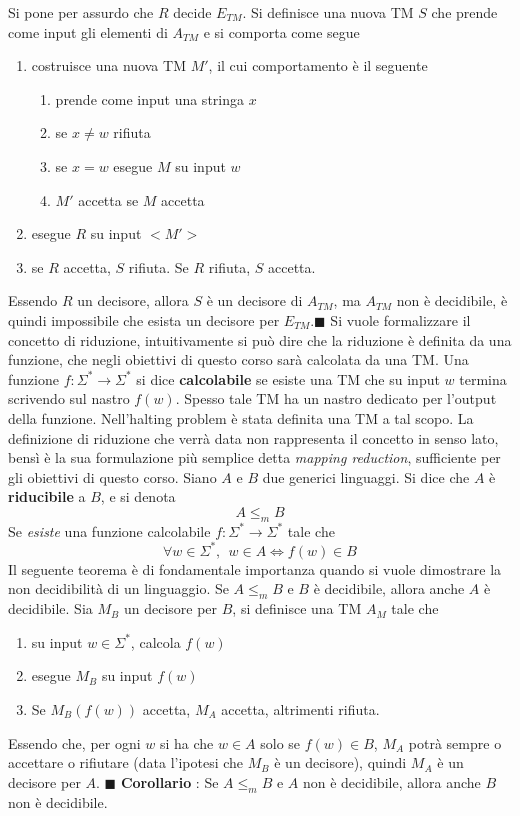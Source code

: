 \documentclass[10pt, letterpaper]{report}
\begin{document}
\dimo{} Si pone per assurdo che $R$ decide $E_{TM}$. Si definisce una nuova TM $S$ che prende come input gli elementi di $A_{TM}$ e si comporta come segue \begin{enumerate}
    \item costruisce una nuova TM $M'$, il cui comportamento è il seguente\begin{enumerate}
        \item prende come input una stringa $x$
        \item se $x\ne w$ rifiuta 
        \item se $x=w$ esegue $M$ su input $w$
        \item $M'$ accetta se $M$ accetta
    \end{enumerate}
    \item esegue $R$ su input $<M'>$
    \item se $R$ accetta, $S$ rifiuta. Se $R$ rifiuta, $S$ accetta.
\end{enumerate}
Essendo $R$ un decisore, allora $S$ è un decisore di $A_{TM}$, ma $A_{TM}$ non è decidibile, è quindi impossibile che esista un decisore per $E_{TM}$.\hfill$\blacksquare$\acc 
Si vuole formalizzare il concetto di riduzione, intuitivamente si può dire che la riduzione è definita da una funzione, che negli obiettivi di questo corso sarà calcolata da una TM.\acc 
{} Una funzione $f:\Sigma^*\rightarrow \Sigma^*$ si dice \textbf{calcolabile} se esiste una TM che su input $w$ termina scrivendo sul nastro $f(w)$. Spesso tale TM ha un nastro dedicato per l'output della funzione.\acc 
Nell'halting problem è stata definita una TM a tal scopo. La definizione di riduzione che verrà data non rappresenta il concetto in senso lato, bensì è la sua formulazione più semplice detta \textit{mapping reduction}, sufficiente per gli obiettivi di questo corso.\acc 
{} Siano $A$ e $B$ due generici linguaggi. Si dice che $A$ è \textbf{riducibile} a $B$, e si denota 
$$ A\le_m B$$
Se \textit{esiste} una funzione calcolabile $f:\Sigma^*\rightarrow \Sigma^*$ tale che 
$$ \forall w\in\Sigma^*, \ \ w\in A \iff f(w)\in B$$
Il seguente teorema è di fondamentale importanza quando si vuole dimostrare la non decidibilità di un linguaggio.\acc 
\teo{} Se $A\le_m B$ e $B$ è decidibile, allora  anche $A$ è decidibile.\acc 
\dimo{} Sia $M_B$ un decisore per $B$, si definisce una TM $A_M$ tale che \begin{enumerate}
    \item su input $w\in\Sigma^*$, calcola $f(w)$
    \item esegue $M_B$ su input $f(w)$ 
    \item Se $M_B(f(w))$ accetta, $M_A$ accetta, altrimenti rifiuta.
\end{enumerate}
Essendo che, per ogni $w$ si ha che $w\in A$ solo se $f(w)\in B$, $M_A$ potrà sempre o accettare o rifiutare (data l'ipotesi che $M_B$ è un decisore), quindi  $M_A$ è un decisore per $A$.
\hfill$\blacksquare$\acc 
\textbf{Corollario} : Se $A\le_m B$ e $A$ non è decidibile, allora  anche $B$ non è decidibile.
\end{document}
